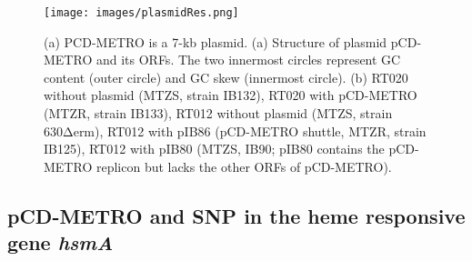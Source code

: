 \documentclass{article}
\begin{document}
\begin{figure}
\centering
\texttt{[image: images/plasmidRes.png]}
\caption{\label{fig:plasmidRes} (a) PCD-METRO is a 7-kb plasmid. (a) Structure of plasmid pCD-METRO and its ORFs. The two innermost circles represent GC content (outer circle) and GC skew (innermost circle). (b) RT020 without plasmid (MTZS, strain IB132), RT020 with pCD-METRO (MTZR, strain IB133), RT012 without plasmid (MTZS, strain 630Δerm), RT012 with pIB86 (pCD-METRO shuttle, MTZR, strain IB125), RT012 with pIB80 (MTZS, IB90; pIB80 contains the pCD-METRO replicon but lacks the other ORFs of pCD-METRO).}
\end{figure}

\subsection{pCD-METRO and SNP in the heme responsive gene {\it hsmA}}
\end{document}
